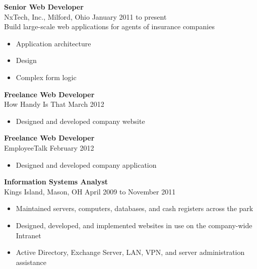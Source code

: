 \documentclass[11pt, line]{res}
\begin{document}
\begin{resume}
				\textbf{Senior Web Developer} \\
				NxTech, Inc.,\; Milford, Ohio
					\hfill January 2011 to present \\
				Build large-scale web applications for agents of insurance companies

				\begin{itemize}
					\item Application architecture
					\item Design
					\item Complex form logic
				\end{itemize}

				\textbf{Freelance Web Developer} \\
				How Handy Is That
					\hfill March 2012

				\begin{itemize}
					\item Designed and developed company website
				\end{itemize}

				\textbf{Freelance Web Developer} \\
				EmployeeTalk
					\hfill February 2012

				\begin{itemize}
					\item Designed and developed company application
				\end{itemize}

				\textbf{Information Systems Analyst} \\
				Kings Island,\; Mason, OH
					\hfill April 2009 to November 2011

				\begin{itemize}
					\item Maintained servers, computers, databases, and cash registers across the park
					\item Designed, developed, and implemented websites in use on the company-wide Intranet
					\item Active Directory, Exchange Server, LAN, VPN, and server administration assistance
				\end{itemize}
	\end{resume}
\end{document}
